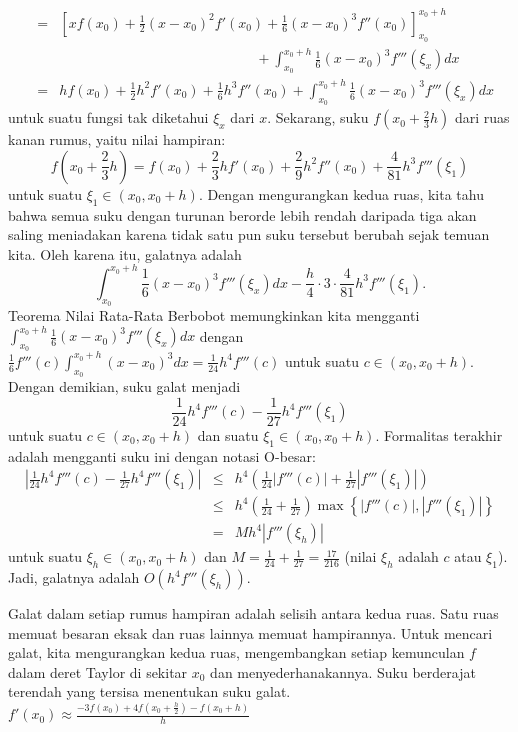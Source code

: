 \begin{description}
\begin{eqnarray*}
 & = & \left[xf(x_{0})+\frac{1}{2}(x-x_{0})^{2}f'(x_{0})+\frac{1}{6}(x-x_{0})^{3}f''(x_{0})\right]_{x_{0}}^{x_{0}+h}\\
 &  & \qquad\qquad\qquad\qquad\qquad\qquad\qquad+\int_{x_{0}}^{x_{0}+h}\frac{1}{6}(x-x_{0})^{3}f'''(\xi_{x})dx\\
 & = & hf(x_{0})+\frac{1}{2}h^{2}f'(x_{0})+\frac{1}{6}h^{3}f''(x_{0})+\int_{x_{0}}^{x_{0}+h}\frac{1}{6}(x-x_{0})^{3}f'''(\xi_{x})dx
\end{eqnarray*}
untuk suatu fungsi tak diketahui $\xi_{x}$ dari $x$. Sekarang, suku
$f(x_{0}+\frac{2}{3}h)$ dari ruas kanan rumus, yaitu nilai hampiran:
\[
f\left(x_{0}+\frac{2}{3}h\right)=f(x_{0})+\frac{2}{3}hf'(x_{0})+\frac{2}{9}h^{2}f''(x_{0})+\frac{4}{81}h^{3}f'''(\xi_{1})
\]
untuk suatu $\xi_{1}\in(x_{0},x_{0}+h)$. Dengan mengurangkan kedua
ruas, kita tahu bahwa semua suku dengan turunan berorde lebih rendah
daripada tiga akan saling meniadakan karena tidak satu pun suku tersebut
berubah sejak temuan kita. Oleh karena itu, galatnya adalah
\[
\int_{x_{0}}^{x_{0}+h}\frac{1}{6}(x-x_{0})^{3}f'''(\xi_{x})dx-\frac{h}{4}\cdot3\cdot\frac{4}{81}h^{3}f'''(\xi_{1}).
\]
Teorema Nilai Rata-Rata Berbobot
memungkinkan kita mengganti $\int_{x_{0}}^{x_{0}+h}\frac{1}{6}(x-x_{0})^{3}f'''(\xi_{x})dx$
dengan $\frac{1}{6}f'''(c)\int_{x_{0}}^{x_{0}+h}(x-x_{0})^{3}dx=\frac{1}{24}h^{4}f'''(c)$
untuk suatu $c\in(x_{0},x_{0}+h)$. Dengan demikian, suku galat menjadi
\[
\frac{1}{24}h^{4}f'''(c)-\frac{1}{27}h^{4}f'''(\xi_{1})
\]
untuk suatu $c\in(x_{0},x_{0}+h)$ dan suatu $\xi_{1}\in(x_{0},x_{0}+h)$.
Formalitas terakhir adalah mengganti suku ini dengan notasi O-besar:
\begin{eqnarray*}
\left|\frac{1}{24}h^{4}f'''(c)-\frac{1}{27}h^{4}f'''(\xi_{1})\right| & \leq & h^{4}\left(\frac{1}{24}\left|f'''(c)\right|+\frac{1}{27}\left|f'''(\xi_{1})\right|\right)\\
 & \leq & h^{4}\left(\frac{1}{24}+\frac{1}{27}\right)\max\left\{ \left|f'''(c)\right|,\left|f'''(\xi_{1})\right|\right\} \\
 & = & Mh^{4}\left|f'''(\xi_{h})\right|
\end{eqnarray*}
untuk suatu $\xi_{h}\in(x_{0},x_{0}+h)$ dan $M=\frac{1}{24}+\frac{1}{27}=\frac{17}{216}$
(nilai $\xi_{h}$ adalah $c$ atau $\xi_{1}$). Jadi, galatnya adalah
$O(h^{4}f'''(\xi_{h}))$.
\item [{\ref{exc:calculusErrors-12}:}] Galat dalam setiap rumus hampiran
adalah selisih antara kedua ruas. Satu ruas memuat besaran eksak dan
ruas lainnya memuat hampirannya. Untuk mencari galat, kita mengurangkan
kedua ruas, mengembangkan setiap kemunculan $f$ dalam deret Taylor
di sekitar $x_{0}$ dan menyederhanakannya. Suku berderajat terendah
yang tersisa menentukan suku galat. ${\displaystyle f'(x_{0})\approx\frac{-3f(x_{0})+4f(x_{0}+\frac{h}{2})-f(x_{0}+h)}{h}}$


\end{description}
